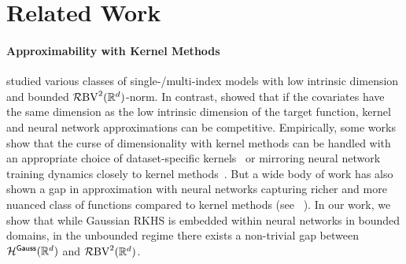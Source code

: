 \section{Related Work}

\paragraph{Approximability with Kernel Methods}

\cite{bach_curse} studied various classes of single-/multi-index models with low intrinsic dimension and bounded $\mathcal{R}\mathrm{BV}^2({\mathbb{R}^d})$-norm. In contrast, \cite{ghorbani2019limitations} showed that if the covariates have the same dimension as the low intrinsic dimension of the target function, kernel and neural network approximations can be competitive. Empirically, some works show that the curse of dimensionality with kernel methods can be handled with an appropriate choice of dataset-specific kernels~\citep{arora2019harnessing, novak2018bayesian, shankar2020neural} or mirroring neural network training dynamics closely to kernel methods~\citep{mean_field_songmei, sirignano2020mean, rotskoff2022trainability, chizat2018global}. 
But a wide body of work has also shown a gap in approximation with neural networks capturing richer and more nuanced class of functions compared to kernel methods (see ~\citep{allen2019can,mean_field_songmei, yehudai2019power, ghorbani2019limitations}). In our work, we show that while Gaussian RKHS is embedded within neural networks in bounded domains, in the unbounded regime there exists a non-trivial gap between ${\mathcal{H}}^{\textsf{Gauss}}(\mathbb{R}^d)$ and $\mathcal{R}\mathrm{BV}^2({\mathbb{R}^d})$.%

